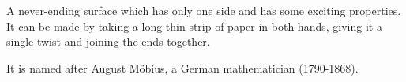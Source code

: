A never-ending surface which has only one side and has some exciting properties.
It can be made by taking a long thin strip of paper in both hands, giving it a 
single twist and joining the ends together.
\par
It is named after August M\"obius, a German mathematician (1790-1868).